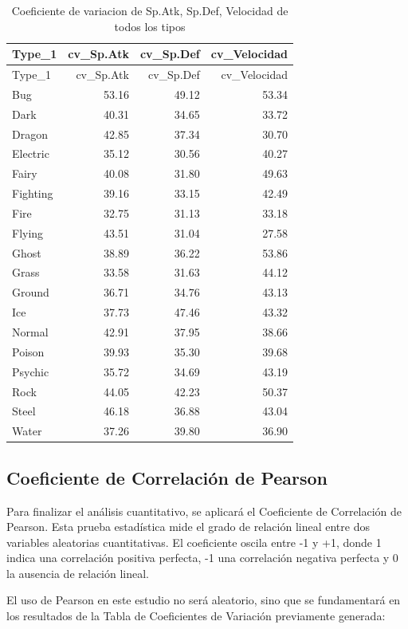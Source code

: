\documentclass[oneside,11pt]{Latex/Classes/PhDthesisPSnPDF}
\begin{document}
\begin{longtable}[]{@{}lrrr@{}}
\caption{Coeficiente de variacion de Sp.Atk, Sp.Def, Velocidad de todos
los tipos}\tabularnewline
\toprule\noalign{}
Type\_1 & cv\_Sp.Atk & cv\_Sp.Def & cv\_Velocidad \\
\midrule\noalign{}
\endfirsthead
\toprule\noalign{}
Type\_1 & cv\_Sp.Atk & cv\_Sp.Def & cv\_Velocidad \\
\midrule\noalign{}
\endhead
\bottomrule\noalign{}
\endlastfoot
Bug & 53.16 & 49.12 & 53.34 \\
Dark & 40.31 & 34.65 & 33.72 \\
Dragon & 42.85 & 37.34 & 30.70 \\
Electric & 35.12 & 30.56 & 40.27 \\
Fairy & 40.08 & 31.80 & 49.63 \\
Fighting & 39.16 & 33.15 & 42.49 \\
Fire & 32.75 & 31.13 & 33.18 \\
Flying & 43.51 & 31.04 & 27.58 \\
Ghost & 38.89 & 36.22 & 53.86 \\
Grass & 33.58 & 31.63 & 44.12 \\
Ground & 36.71 & 34.76 & 43.13 \\
Ice & 37.73 & 47.46 & 43.32 \\
Normal & 42.91 & 37.95 & 38.66 \\
Poison & 39.93 & 35.30 & 39.68 \\
Psychic & 35.72 & 34.69 & 43.19 \\
Rock & 44.05 & 42.23 & 50.37 \\
Steel & 46.18 & 36.88 & 43.04 \\
Water & 37.26 & 39.80 & 36.90 \\
\end{longtable}

\subsection{Coeficiente de Correlación de Pearson}

Para finalizar el análisis cuantitativo, se aplicará el Coeficiente de
Correlación de Pearson. Esta prueba estadística mide el grado de
relación lineal entre dos variables aleatorias cuantitativas. El
coeficiente oscila entre -1 y +1, donde 1 indica una correlación
positiva perfecta, -1 una correlación negativa perfecta y 0 la ausencia
de relación lineal.

El uso de Pearson en este estudio no será aleatorio, sino que se
fundamentará en los resultados de la Tabla de Coeficientes de Variación
previamente generada:
\end{document}

